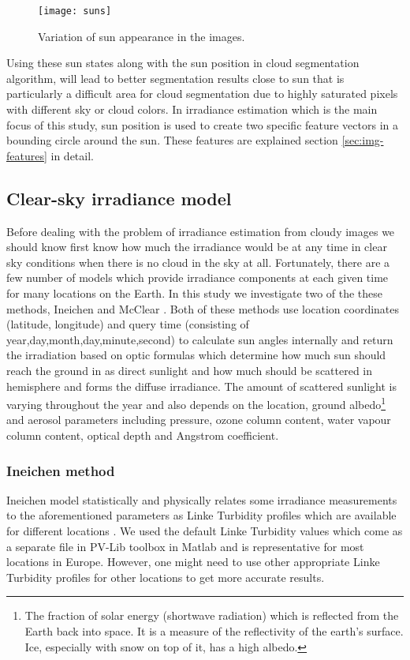 \begin{figure}[h]
\caption{Variation of sun appearance in the images.}
\label{fig:sun_variation}
\texttt{[image: suns]}
\centering
\end{figure}

Using these sun states along with the sun position in cloud segmentation algorithm, will lead to better segmentation results close to sun that is particularly a difficult area for cloud segmentation due to highly saturated pixels with different sky or cloud colors. In irradiance estimation which is the main focus of this study, sun position is used to create two specific feature vectors in a bounding circle around the sun. These features are explained section \ref{sec:img-features} in detail.

\subsection{Clear-sky irradiance model}
Before dealing with the problem of irradiance estimation from cloudy images we should know first know how much the irradiance would be at any time in clear sky conditions when there is no cloud in the sky at all. Fortunately, there are a few number of models which provide irradiance components at each given time for many locations on the Earth. In this study we investigate two of the these methods, Ineichen \cite{clear_sky_model} and McClear \cite{mcclear_alg}. Both of these methods use location coordinates (latitude, longitude) and query time (consisting of year,day,month,day,minute,second) to calculate sun angles internally and return the irradiation based on optic formulas which determine how much sun should reach the ground in as direct sunlight and how much should be scattered in hemisphere and forms the diffuse irradiance. The amount of scattered sunlight is varying throughout the year and also depends on the location, ground albedo\footnote{The fraction of solar energy (shortwave radiation) which is reflected from the Earth back into space. It is a measure of the reflectivity of the earth's surface. Ice, especially with snow on top of it, has a high albedo.} and aerosol parameters including pressure, ozone column content, water vapour column content,  optical depth and Angstrom coefficient. 

\subsubsection{Ineichen method}
Ineichen model statistically and physically relates some irradiance measurements to the aforementioned parameters as Linke Turbidity profiles which are available for different locations . We used the default Linke Turbidity values which come as a separate file in PV-Lib toolbox \cite{pv_lib_toolbox} in Matlab and is representative for most locations in Europe. However, one might need to use other appropriate Linke Turbidity profiles for other locations to get more accurate results.
 
